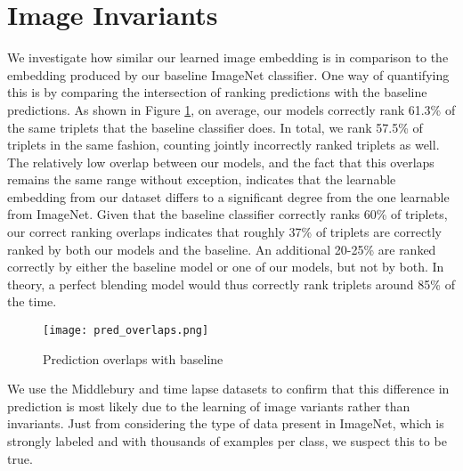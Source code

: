 \section{Image Invariants}
We investigate how similar our learned image embedding is in comparison to the embedding produced by our baseline ImageNet classifier. One way of quantifying this is by comparing the intersection of ranking predictions with the baseline predictions. As shown in Figure \ref{fig:overlaps}, on average, our models correctly rank 61.3\% of the same triplets that the baseline classifier does. In total, we rank 57.5\% of triplets in the same fashion, counting jointly incorrectly ranked triplets as well. The relatively low overlap between our models, and the fact that this overlaps remains the same range without exception, indicates that the learnable embedding from our dataset differs to a significant degree from the one learnable from ImageNet. Given that the baseline classifier correctly ranks 60\% of triplets, our correct ranking overlaps indicates that roughly 37\% of triplets are correctly ranked by both our models and the baseline. An additional 20-25\% are ranked correctly by either the baseline model or one of our models, but not by both. In theory, a perfect blending model would thus correctly rank triplets around 85\% of the time. 

\begin{figure}[!htbp]
	\centering
		\texttt{[image: pred\_overlaps.png]} 
	\caption{Prediction overlaps with baseline}
	\label{fig:overlaps}
\end{figure}

We use the Middlebury and time lapse datasets to confirm that this difference in prediction is most likely due to the learning of image variants rather than invariants. Just from considering the type of data present in ImageNet, which is strongly labeled and with thousands of examples per class, we suspect this to be true. 

























